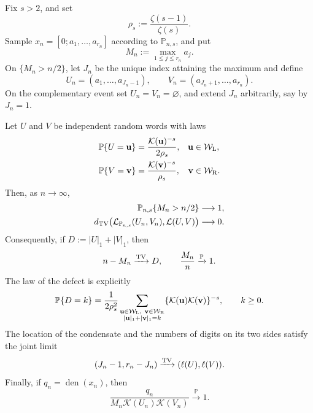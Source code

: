 \begin{theorem}
\label{thm:brocot-condensation}
Fix \(s>2\), and set
\[
 \rho_s:=\frac{\zeta(s-1)}{\zeta(s)}.
\]
Sample
\(x_n=[0;a_1,\ldots,a_{r_n}]\) according to \(\mathbb P_{n,s}\), and put
\[
 M_n:=\max_{1\le j\le r_n}a_j.
\]
On \(\{M_n>n/2\}\), let \(J_n\) be the unique index attaining the maximum
and define
\[
 U_n=(a_1,\ldots,a_{J_n-1}),
 \qquad
 V_n=(a_{J_n+1},\ldots,a_{r_n}).
\]
On the complementary event set \(U_n=V_n=\varnothing\), and extend \(J_n\)
arbitrarily, say by \(J_n=1\).

Let \(U\) and \(V\) be independent random words with laws
\begin{equation}
 \begin{aligned}
  \mathbb P\{U=\mathbf u\}
  &=\frac{\mathcal K(\mathbf u)^{-s}}{2\rho_s},
  &\mathbf u&\in\mathcal W_{\rm L},\\
  \mathbb P\{V=\mathbf v\}
  &=\frac{\mathcal K(\mathbf v)^{-s}}{\rho_s},
  &\mathbf v&\in\mathcal W_{\rm R}.
 \end{aligned}
 \label{eq:limiting-context-laws}
\end{equation}
Then, as \(n\to\infty\),
\begin{align}
 \mathbb P_{n,s}\{M_n>n/2\}&\longrightarrow1,
 \label{eq:brocot-unique-condensate}\\
 d_{\rm TV}\bigl(\mathcal L_{\mathbb P_{n,s}}(U_n,V_n),
                   \mathcal L(U,V)\bigr)&\longrightarrow0.
 \label{eq:brocot-context-tv}
\end{align}
Consequently, if \(D:=|U|_1+|V|_1\), then
\begin{equation}
 n-M_n\xrightarrow{\rm TV}D,
 \qquad
 \frac{M_n}{n}\xrightarrow{\mathbb P}1.
 \label{eq:brocot-defect-limit}
\end{equation}
The law of the defect is explicitly
\begin{equation}
 \mathbb P\{D=k\}
 =\frac1{2\rho_s^2}
 \sum_{\substack{\mathbf u\in\mathcal W_{\rm L},\
                   \mathbf v\in\mathcal W_{\rm R}\\
                   |\mathbf u|_1+|\mathbf v|_1=k}}
 \{\mathcal K(\mathbf u)\mathcal K(\mathbf v)\}^{-s},
 \qquad k\ge0.
 \label{eq:brocot-defect-law}
\end{equation}
The location of the condensate and the numbers of digits on its two sides
satisfy the joint limit
\begin{equation}
 (J_n-1,r_n-J_n)\xrightarrow{\rm TV}
 (\ell(U),\ell(V)).
 \label{eq:brocot-location-limit}
\end{equation}
Finally, if \(q_n=\operatorname{den}(x_n)\), then
\begin{equation}
 \frac{q_n}{M_n\mathcal K(U_n)\mathcal K(V_n)}
 \xrightarrow{\mathbb P}1.
 \label{eq:brocot-denominator-ratio}
\end{equation}
\end{theorem}

